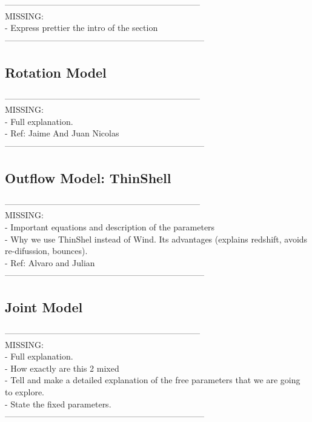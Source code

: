 \documentclass{latex/emulateapj}
\begin{document}
---------------------------------------------------------------------\\
MISSING: \\
- Express prettier the intro of the section\\
-----------------------------------------------------------------------\\

\subsection{Rotation Model}
---------------------------------------------------------------------\\
MISSING: \\
- Full explanation.\\
- Ref: Jaime And Juan Nicolas\\
-----------------------------------------------------------------------\\




\subsection{Outflow Model: ThinShell}

---------------------------------------------------------------------\\
MISSING:\\
- Important equations and description of the parameters\\
- Why we use ThinShel instead of Wind. Its advantages (explains redshift, avoids re-difussion, bounces).\\
- Ref: Alvaro and Julian\\
-----------------------------------------------------------------------\\

\subsection{Joint Model}

---------------------------------------------------------------------\\
MISSING: \\
- Full explanation.\\
- How exactly are this 2 mixed\\
- Tell and make a detailed explanation of the free parameters that we are going to explore. \\
- State the fixed parameters.\\
-----------------------------------------------------------------------\\
\end{document}
